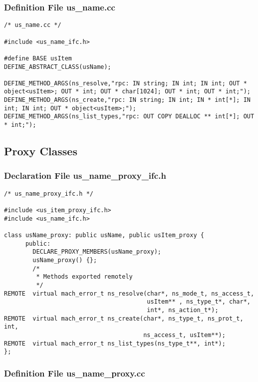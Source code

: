 \subsubsection{Definition File us\_name.cc}
{\footnotesize
\begin{verbatim}
/* us_name.cc */

#include <us_name_ifc.h>

#define BASE usItem
DEFINE_ABSTRACT_CLASS(usName);

DEFINE_METHOD_ARGS(ns_resolve,"rpc: IN string; IN int; IN int; OUT * object<usItem>; OUT * int; OUT * char[1024]; OUT * int; OUT * int;");
DEFINE_METHOD_ARGS(ns_create,"rpc: IN string; IN int; IN * int[*]; IN int; IN int; OUT * object<usItem>;");
DEFINE_METHOD_ARGS(ns_list_types,"rpc: OUT COPY DEALLOC ** int[*]; OUT * int;");
\end{verbatim}
}

\subsection{Proxy Classes}
\subsubsection{Declaration File us\_name\_proxy\_ifc.h}

{\footnotesize
\begin{verbatim}
/* us_name_proxy_ifc.h */

#include <us_item_proxy_ifc.h>
#include <us_name_ifc.h>

class usName_proxy: public usName, public usItem_proxy {
      public:
        DECLARE_PROXY_MEMBERS(usName_proxy);
        usName_proxy() {};
        /*
         * Methods exported remotely
         */
REMOTE  virtual mach_error_t ns_resolve(char*, ns_mode_t, ns_access_t, 
                                        usItem** , ns_type_t*, char*, 
                                        int*, ns_action_t*);
REMOTE  virtual mach_error_t ns_create(char*, ns_type_t, ns_prot_t, int,
                                       ns_access_t, usItem**);
REMOTE  virtual mach_error_t ns_list_types(ns_type_t**, int*);
};

\end{verbatim}
}

\subsubsection{Definition File us\_name\_proxy.cc}

